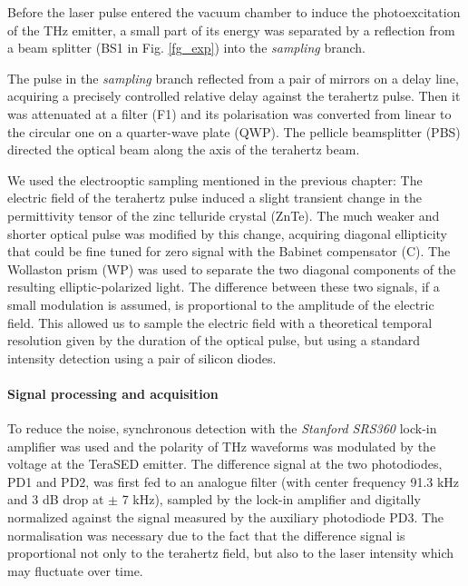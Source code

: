 Before the laser pulse entered the vacuum chamber to induce the photoexcitation of the THz emitter, a small part of its energy was separated by a reflection from a beam splitter (BS1 in Fig. \ref{fg_exp}) into the \textit{sampling} branch. 

The pulse in the \textit{sampling} branch reflected from a pair of mirrors on a delay line, acquiring a precisely controlled relative delay against the terahertz pulse. Then it was attenuated at a filter (F1) and its polarisation was converted from linear to the circular one on a quarter-wave plate (QWP). The pellicle beamsplitter (PBS) directed the optical beam along the axis of the terahertz beam. 

We used the electrooptic sampling mentioned in the previous chapter: The electric field of the terahertz pulse induced a slight transient change in the permittivity tensor of the zinc telluride crystal (ZnTe). The much weaker and shorter optical pulse was modified by this change, acquiring diagonal ellipticity that could be fine tuned for zero signal with the Babinet compensator (C). The Wollaston prism (WP) was used to separate the two diagonal components of the resulting elliptic-polarized light. The difference between these two signals, if a small modulation is assumed, is proportional to the amplitude of the electric field. This allowed us to sample the electric field with a theoretical temporal resolution given by the duration of the optical pulse, but using a standard intensity detection using a pair of silicon diodes.   

\paragraph{Signal processing and acquisition}%
To reduce the noise, synchronous detection with the \textit{Stanford SRS360} lock-in amplifier was used and the polarity of THz waveforms was modulated by the voltage at the TeraSED emitter. The difference signal at the two photodiodes, PD1 and PD2, was first fed to an analogue filter (with center frequency 91.3 kHz and 3 dB drop at $\pm$ 7 kHz), sampled by the lock-in amplifier and digitally normalized against the signal measured by the auxiliary photodiode PD3. The normalisation was necessary due to the fact that the difference signal is proportional not only to the terahertz field, but also to the laser intensity which may fluctuate over time. 

